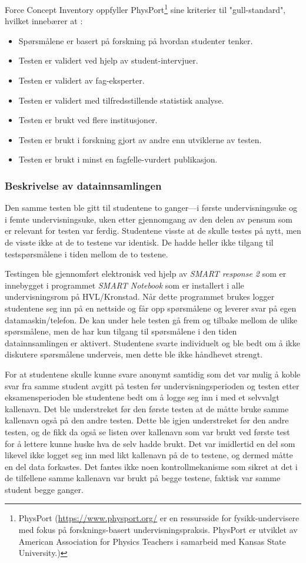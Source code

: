 \documentclass[a4paper,norsk,12pt]{article}
\begin{document}
Force Concept Inventory oppfyller PhysPort\footnote{PhysPort (\url{https://www.physport.org/} er en ressursside for fysikk-undervisere med fokus på forsknings-basert undervisningspraksis. PhysPort er utviklet av American Association for Physics Teachers i samarbeid med Kansas State University.)} sine kriterier til "gull-standard", hvilket innebærer at \cite{2014arXiv1404.6500M}:
\begin{itemize}
\item
Spørsmålene er basert på forskning på hvordan studenter tenker.
\item
Testen er validert ved hjelp av student-intervjuer.
\item
Testen er validert av fag-eksperter.
\item
Testen er validert med tilfredsstillende statistisk analyse.
\item
Testen er brukt ved flere institusjoner.
\item
Testen er brukt i forskning gjort av andre enn utviklerne av testen.
\item
Testen er brukt i minst en fagfelle-vurdert publikasjon.
\end{itemize}

\subsubsection{Beskrivelse av datainnsamlingen}
Den samme testen ble gitt til studentene to ganger---i første undervisningsuke og i femte undervisningsuke, uken etter gjennomgang av den delen av pensum som er relevant for testen var ferdig. Studentene visste at de skulle testes på nytt, men de visste ikke at de to testene var identisk. De hadde heller ikke tilgang til testspørsmålene i tiden mellom de to testene. 

Testingen ble gjennomført elektronisk ved hjelp av \emph{SMART response 2} som er innebygget i programmet \emph{SMART Notebook} \cite{smart} som er installert i alle undervisningsrom på HVL/Kronstad. Når dette programmet brukes logger studentene seg inn på en nettside og får opp spørsmålene og leverer svar på egen datamaskin/telefon. De kan under hele testen gå frem og tilbake mellom de ulike spørsmålene, men de har kun tilgang til spørsmålene i den tiden datainnsamlingen er aktivert. Studentene svarte individuelt og ble bedt om å ikke diskutere spørsmålene underveis, men dette ble ikke håndhevet strengt. 

For at studentene skulle kunne svare anonymt samtidig som det var mulig å koble svar fra samme student avgitt på testen før undervisningsperioden og testen etter eksamensperioden ble studentene bedt om å logge seg inn i med et selvvalgt kallenavn. Det ble understreket før den første testen at de måtte bruke samme kallenavn også på den andre testen. Dette ble igjen understreket før den andre testen, og de fikk da også se listen over kallenavn som var brukt ved første test for å lettere kunne huske hva de selv hadde brukt. Det var imidlertid en del som likevel ikke logget seg inn med likt kallenavn på de to testene, og dermed måtte en del data forkastes. Det fantes ikke noen kontrollmekanisme som sikret at det i de tilfellene samme kallenavn var brukt på begge testene, faktisk var samme student begge ganger.
\end{document}
